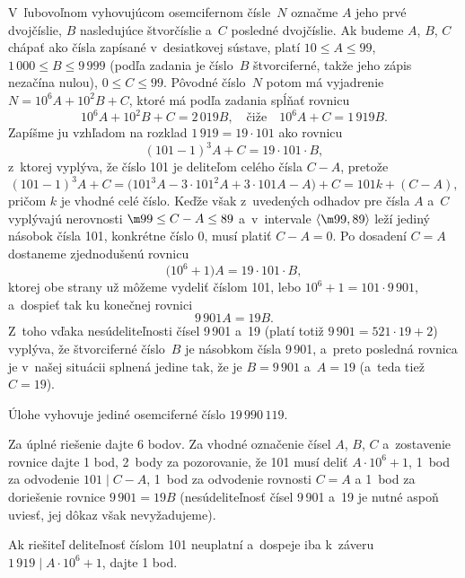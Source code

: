 {%
V~ľubovoľnom vyhovujúcom osemcifernom čísle~$N$ označme $A$ jeho prvé
dvojčíslie, $B$ nasledujúce štvorčíslie a~$C$ posledné dvojčíslie.
Ak budeme $A$, $B$, $C$ chápať ako čísla zapísané v~desiatkovej sústave,
platí $10\le A\le 99$, $1\,000\le B\le 9\,999$ (podľa
zadania je číslo~$B$ štvorciferné, takže jeho zápis nezačína
nulou), $0\le C\le 99$. %
Pôvodné číslo~$N$ potom má vyjadrenie $N=10^6A+10^2B+C$, ktoré má
podľa zadania spĺňať rovnicu
$$
10^6A+10^2B+C=2\,019B,\quad\text{čiže}\quad
10^6A+C=1\,919B.
$$
Zapíšme ju vzhľadom na rozklad $1\,919=19\cdot101$ ako rovnicu
$$
(101-1)^3A+C=19\cdot101\cdot B,
$$
z~ktorej vyplýva, že číslo 101 je deliteľom celého čísla $C-A$,
pretože
$$
(101-1)^3A+C=\bigl(101^3A-3\cdot101^2A+3\cdot101A-A\bigr)+C=101k+(C-A),
$$
pričom $k$ je vhodné celé číslo. Keďže však z~uvedených odhadov pre
čísla $A$ a~$C$ vyplývajú nerovnosti $\m99\le C-A\le89$
a~v~intervale $\langle\m99,89\rangle$ leží jediný násobok čísla 101,
konkrétne číslo 0, musí platiť $C-A=0$. Po dosadení $C=A$ dostaneme
zjednodušenú rovnicu
$$
\bigl(10^6+1\bigr)A=19\cdot101\cdot B,
$$
ktorej obe strany už môžeme vydeliť číslom 101, lebo
$10^6+1=101\cdot9\,901$, a~dospieť tak ku konečnej rovnici
$$
9\,901A=19B.
$$
Z~toho vďaka nesúdeliteľnosti čísel 9\,901 a~19 (platí totiž
$9\,901=521\cdot19+2$) vyplýva, že štvorciferné číslo~$B$ je násobkom čísla
9\,901, a~preto posledná rovnica je v~našej situácii splnená jedine
tak, že je $B=9\,901$ a~$A=19$ (a~teda tiež $C=19$).

\odpoved
Úlohe vyhovuje jediné osemciferné číslo
$19\,990\,119$.

\nobreak\medskip\petit\noindent
Za úplné riešenie dajte 6 bodov.
Za vhodné označenie čísel $A$, $B$,
$C$ a~zostavenie rovnice dajte 1 bod, 2~body
za pozorovanie, že 101 musí deliť $A\cdot10^6 + 1$,
1~bod za odvodenie $101 \mid C-A$,
1~bod za odvodenie rovnosti $C = A$ a
1~bod za doriešenie rovnice $9\,901 = 19B$ (nesúdeliteľnosť čísel 9\,901 a~19
je nutné aspoň uviesť, jej dôkaz však nevyžadujeme).

Ak riešiteľ deliteľnosť číslom 101 neuplatní a~dospeje iba
k~záveru $1\,919\mid A\cdot10^6 + 1$, dajte 1 bod.
\endpetit
\bigbreak
}

